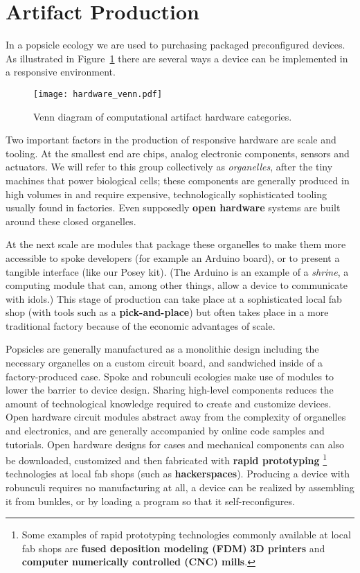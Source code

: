 \section{Artifact Production}
\label{sec:production}
%
In a popsicle ecology we are used to purchasing packaged preconfigured devices. As illustrated in Figure~\ref{fig:hardware_venn} there are several ways a device can be implemented in a responsive environment. 

\begin{figure}[b!]
  \centering
    \texttt{[image: hardware\_venn.pdf]}
  \caption{Venn diagram of computational artifact hardware categories.}
  \label{fig:hardware_venn}
\end{figure}

Two important factors in the production of responsive hardware are scale and tooling. 
At the smallest end are chips, analog electronic components, sensors and actuators. 
We will refer to this group collectively as \emph{organelles}, after the tiny machines that power biological cells; these components are generally produced in high volumes in and require expensive, technologically sophisticated tooling usually found in factories. 
Even supposedly \textbf{open hardware} systems are built around these closed organelles. 

At the next scale are modules that package these organelles to make them more accessible to spoke developers (for example an Arduino board), or to present a tangible interface (like our Posey kit). 
(The Arduino is an example of a \emph{shrine}, a computing module that can, among other things, allow a device to communicate with idols.) 
This stage of production can take place at a sophisticated local fab shop (with tools such as a \textbf{pick-and-place}) but often takes place in a more traditional factory because of the economic advantages of scale.

Popsicles are generally manufactured as a monolithic design including the necessary organelles on a custom circuit board, and sandwiched inside of a factory-produced case. 
Spoke and robunculi ecologies make use of modules to lower the barrier to device design. 
Sharing high-level components reduces the amount of technological knowledge required to create and customize devices.
Open hardware circuit modules abstract away from the complexity of organelles and electronics, and are generally accompanied by online code samples and tutorials. 
Open hardware designs for cases and mechanical components can also be downloaded, customized and then fabricated with \textbf{rapid prototyping}%
\footnote{Some examples of rapid prototyping technologies commonly available at local fab shops are \textbf{fused deposition modeling (FDM)} \textbf{3D printers} and \textbf{computer numerically controlled (CNC) mills}.}
technologies at local fab shops (such as \textbf{hackerspaces}).
Producing a device with robunculi requires no manufacturing at all, a device can be realized by assembling it from bunkles, or by loading a program so that it self-reconfigures.


